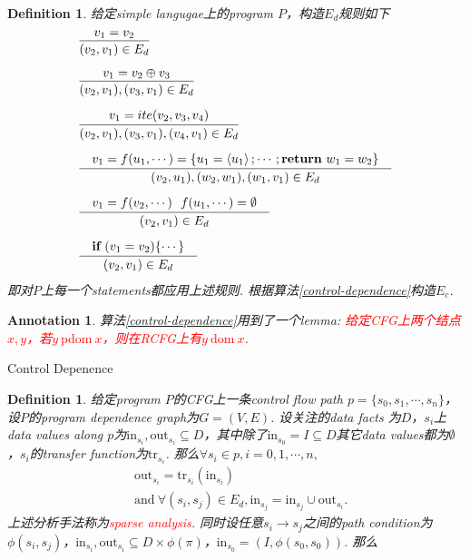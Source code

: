 \documentclass{article}
\newtheorem{definition}[theorem]{Definition}
\newtheorem{annotation}[theorem]{Annotation}
\newcommand{\redt}[1]{\textcolor{red}{#1}}
\newcommand{\abracket}[1]{\ensuremath{\left< #1 \right>}}
\begin{document}
\begin{definition}
\rm 给定simple langugae上的program $P$，构造$E_d$规则如下
$$
\begin{aligned}
&\infer{(v_2,v_1) \in E_d}{&v_1=v_2&} \\[0.5em]
&\infer{(v_2,v_1),(v_3,v_1) \in  E_d}{v_1 = v_2 \oplus v_3} \\[0.5em] 
&\infer{(v_2,v_1),(v_3,v_1),(v_4,v_1) \in E_d}{&v_1 = ite(v_2,v_3,v_4)&} \\[0.5em] 
&\infer{(v_2,u_1),(w_2,w_1),(w_1,v_1) \in E_d}{&v_1 = f(u_1,\cdots) = \{u_1 = \abracket{u_1}; \cdots; \textbf{return}~w_1=w_2\} &} \\[0.5em] 
&\infer{(v_2,v_1) \in E_d}{&v_1 = f(v_2,\cdots) ~~ f(u_1,\cdots) = \emptyset&} \\[0.5em] 
&\infer{(v_2,v_1)\in E_d}{&\textbf{if}~(v_1=v_2)\{\cdots\}&}
\end{aligned}
$$
即对$P$上每一个statements都应用上述规则. 根据算法\ref{control-dependence}构造$E_c$.
\end{definition}

\begin{annotation}
\rm 算法\ref{control-dependence}用到了一个lemma: \redt{给定CFG上两个结点$x,y$，若$y~\text{pdom}~x$，则在RCFG上有$y~\text{dom}~x$}. 
\end{annotation}

\begin{algorithm}
\label{control-dependence}
\caption{Control Depenence}
\DontPrintSemicolon
{} 


\end{algorithm}

\begin{definition}
\rm 给定program $P$的CFG上一条control flow path  $p = \{s_0, s_1,\cdots, s_n\}$，设$P$的program dependence graph为$G = (V,E)$. 设关注的data facts 为$D$，$s_i$上data values along $p$为$\text{in}_{s_i},\text{out}_{s_i} \subseteq D$，其中除了$\text{in}_{s_0} = I \subseteq D$其它data values都为$\emptyset$，$s_i$的transfer function为$\text{tr}_{s_i}$. 那么$\forall s_i \in p, i=0,1,\cdots,n,$
$$
\begin{aligned}
&\text{out}_{s_i} = \text{tr}_{s_i}(\text{in}_{s_i}) \\
&\text{and}~\forall (s_i,s_j) \in E_d,  \text{in}_{s_j} = \text{in}_{s_j} \cup \text{out}_{s_i}. 
\end{aligned}
$$
上述分析手法称为\redt{sparse analysis}. 同时设任意$s_i \to s_j$之间的path condition为$\phi(s_i,s_j)$，$\text{in}_{s_i},\text{out}_{s_i} \subseteq D \times \phi(\pi)$，$\text{in}_{s_0} = (I,\phi(s_0,s_0))$. 那么
\end{definition}
\end{document}

